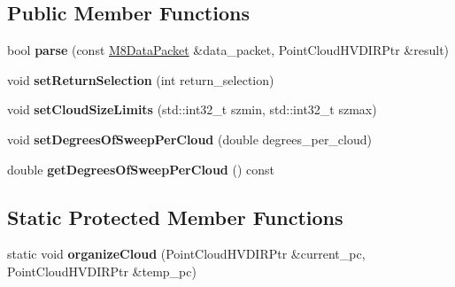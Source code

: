 \subsection*{Public Member Functions}
\begin{DoxyCompactItemize}
\item 
\hypertarget{structquanergy_1_1client_1_1DataPacketParserM8_a3d55d291d44be412eb30982c109c9b26}{bool {\bfseries parse} (const \hyperlink{structquanergy_1_1client_1_1M8DataPacket}{M8\-Data\-Packet} \&data\-\_\-packet, Point\-Cloud\-H\-V\-D\-I\-R\-Ptr \&result)}\label{structquanergy_1_1client_1_1DataPacketParserM8_a3d55d291d44be412eb30982c109c9b26}

\item 
\hypertarget{structquanergy_1_1client_1_1DataPacketParserM8_aff75b6e5c7965909ac77080f289770b8}{void {\bfseries set\-Return\-Selection} (int return\-\_\-selection)}\label{structquanergy_1_1client_1_1DataPacketParserM8_aff75b6e5c7965909ac77080f289770b8}

\item 
\hypertarget{structquanergy_1_1client_1_1DataPacketParserM8_a6f64769dfea51dbc43691f5ff43e8b0b}{void {\bfseries set\-Cloud\-Size\-Limits} (std\-::int32\-\_\-t szmin, std\-::int32\-\_\-t szmax)}\label{structquanergy_1_1client_1_1DataPacketParserM8_a6f64769dfea51dbc43691f5ff43e8b0b}

\item 
\hypertarget{structquanergy_1_1client_1_1DataPacketParserM8_aea770e4f27886c7fff318fb72535ed8d}{void {\bfseries set\-Degrees\-Of\-Sweep\-Per\-Cloud} (double degrees\-\_\-per\-\_\-cloud)}\label{structquanergy_1_1client_1_1DataPacketParserM8_aea770e4f27886c7fff318fb72535ed8d}

\item 
\hypertarget{structquanergy_1_1client_1_1DataPacketParserM8_ae919de33ff1688037d4aff2a5c668284}{double {\bfseries get\-Degrees\-Of\-Sweep\-Per\-Cloud} () const }\label{structquanergy_1_1client_1_1DataPacketParserM8_ae919de33ff1688037d4aff2a5c668284}

\end{DoxyCompactItemize}
\subsection*{Static Protected Member Functions}
\begin{DoxyCompactItemize}
\item 
\hypertarget{structquanergy_1_1client_1_1DataPacketParserM8_a07831058de6fe2804b51d6a1ff9394c4}{static void {\bfseries organize\-Cloud} (Point\-Cloud\-H\-V\-D\-I\-R\-Ptr \&current\-\_\-pc, Point\-Cloud\-H\-V\-D\-I\-R\-Ptr \&temp\-\_\-pc)}\label{structquanergy_1_1client_1_1DataPacketParserM8_a07831058de6fe2804b51d6a1ff9394c4}

\end{DoxyCompactItemize}
